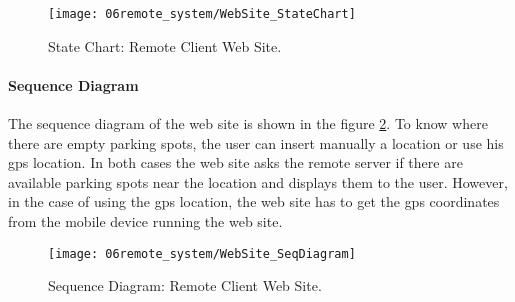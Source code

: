 \begin{figure}[H]
	\centering
	\texttt{[image: 06remote\_system/WebSite\_StateChart]}
	\caption{State Chart: Remote Client Web Site.}
	\label{fig:StateChart_WebSite}
\end{figure}

\clearpage

\paragraph*{Sequence Diagram}
The sequence diagram of the web site is shown in the figure \ref{fig:SeqDiagram_WebSite}. To know where there are empty parking spots, the user can insert manually a location or use his \ac{gps} location. In both cases the web site asks the remote server if there are available parking spots near the location and displays them to the user. However, in the case of using the \ac{gps} location, the web site has to get the \ac{gps} coordinates from the mobile device running the web site.

\begin{figure}[H]
	\centering
	\texttt{[image: 06remote\_system/WebSite\_SeqDiagram]}
	\caption{Sequence Diagram: Remote Client Web Site.}
	\label{fig:SeqDiagram_WebSite}
\end{figure}